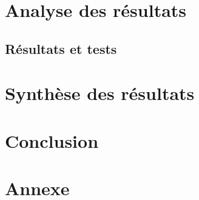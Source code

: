 \documentclass[11pt]{article}
\begin{document}
\cleardoublepage


\section{Analyse des résultats}


\subsection{}

\subsection{Résultats et tests}

\cleardoublepage



\section{Synthèse des résultats}

\cleardoublepage


\section{Conclusion}
\cleardoublepage



\section{Annexe}


\cleardoublepage
\end{document}
